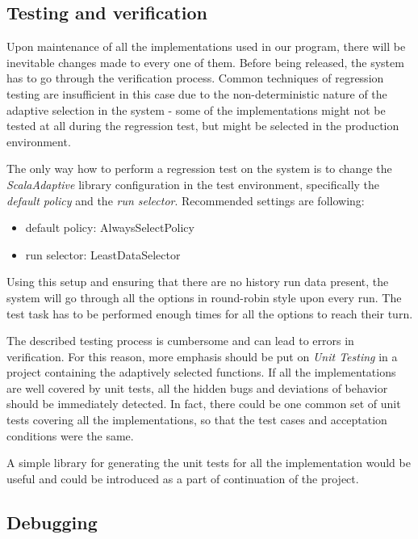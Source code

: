 
\subsection{Testing and verification}

Upon maintenance of all the implementations used in our program, there will be inevitable changes made to every one of them. Before being released, the system has to go through the verification process. Common techniques of regression testing are insufficient in this case due to the non-deterministic nature of the adaptive selection in the system - some of the implementations might not be tested at all during the regression test, but might be selected in the production environment.

The only way how to perform a regression test on the system is to change the \textit{ScalaAdaptive} library configuration in the test environment, specifically the \textit{default policy} and the \textit{run selector}. Recommended settings are following:

 \begin{itemize}
 	\item default policy: AlwaysSelectPolicy
 	\item run selector: LeastDataSelector
 \end{itemize}

Using this setup and ensuring that there are no history run data present, the system will go through all the options in round-robin style upon every run. The test task has to be performed enough times for all the options to reach their turn.

The described testing process is cumbersome and can lead to errors in verification. For this reason, more emphasis should be put on \textit{Unit Testing} in a project containing the adaptively selected functions. If all the implementations are well covered by unit tests, all the hidden bugs and deviations of behavior should be immediately detected. In fact, there could be one common set of unit tests covering all the implementations, so that the test cases and acceptation conditions were the same.

A simple library for generating the unit tests for all the implementation would be useful and could be introduced as a part of continuation of the project.

\subsection{Debugging}

